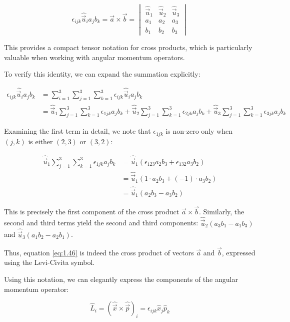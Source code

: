 \[
\epsilon_{i j k} \hat{\vec{u}}_{i} a_{j} b_{k}=\vec{a} \times \vec{b}=\begin{vmatrix}
\hat{\vec{u}}_{1} & \hat{\vec{u}}_{2} & \hat{\vec{u}}_{3} \label{eq:1.46}\\
a_{1} & a_{2} & a_{3} \\
b_{1} & b_{2} & b_{3}
\end{vmatrix}
\]

This provides a compact tensor notation for cross products, which is particularly valuable when working with angular momentum operators.

To verify this identity, we can expand the summation explicitly:


\begin{align}
\epsilon_{i j k} \hat{\vec{u}}_{i} a_{j} b_{k} &= \sum_{i=1}^{3} \sum_{j=1}^{3} \sum_{k=1}^{3} \epsilon_{i j k} \hat{\vec{u}}_{i} a_{j} b_{k} \\
&= \hat{\vec{u}}_{1} \sum_{j=1}^{3} \sum_{k=1}^{3} \epsilon_{1 j k} a_{j} b_{k} + \hat{\vec{u}}_{2} \sum_{j=1}^{3} \sum_{k=1}^{3} \epsilon_{2 j k} a_{j} b_{k} + \hat{\vec{u}}_{3} \sum_{j=1}^{3} \sum_{k=1}^{3} \epsilon_{3 j k} a_{j} b_{k}
\end{align}

Examining the first term in detail, we note that $\epsilon_{1jk}$ is non-zero only when $(j,k)$ is either $(2,3)$ or $(3,2)$:

\begin{align}
\hat{\vec{u}}_{1} \sum_{j=1}^{3} \sum_{k=1}^{3} \epsilon_{1 j k} a_{j} b_{k} &= \hat{\vec{u}}_{1}(\epsilon_{123} a_{2} b_{3} + \epsilon_{132} a_{3} b_{2})  \\
&= \hat{\vec{u}}_{1}(1 \cdot a_{2} b_{3} + (-1) \cdot a_{3} b_{2}) \\
&= \hat{\vec{u}}_{1}(a_{2} b_{3} - a_{3} b_{2})
\end{align}

This is precisely the first component of the cross product $\vec{a} \times \vec{b}$. Similarly, the second and third terms yield the second and third components:
$\hat{\vec{u}}_{2}(a_{3} b_{1} - a_{1} b_{3})$ and $\hat{\vec{u}}_{3}(a_{1} b_{2} - a_{2} b_{1})$.

Thus, equation \eqref{eq:1.46} is indeed the cross product of vectors $\vec{a}$ and $\vec{b}$, expressed using the Levi-Civita symbol.

Using this notation, we can elegantly express the components of the angular momentum operator:

\begin{equation}
\hat{L}_{i} = (\hat{\vec{x}} \times \hat{\vec{p}})_{i} = \epsilon_{i j k} \hat{x}_{j} \hat{p}_{k}
\end{equation}

